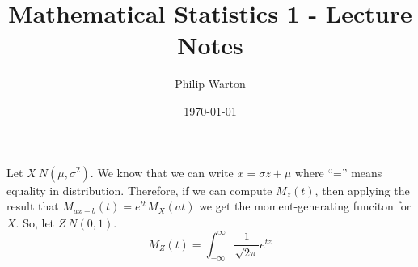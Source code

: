 \documentclass{article}
\begin{document}
\title{Mathematical Statistics 1 - Lecture Notes}
\author{Philip Warton}
\date{\today}
\maketitle
\section{}
Let $X ~ N(\mu, \sigma^2)$. We know that we can write $x = \sigma z + \mu$ where ``='' means equality in distribution.
Therefore, if we can compute $M_z(t)$, then applying the result that $M_{ax+b}(t) = e^{tb}M_X(at)$ we get the moment-generating funciton for $X$.
So, let $Z ~ N(0,1)$.
\[
    M_Z(t) = \int_{-\infty}^\infty \frac{1}{\sqrt{2 \pi}} e^{tz}
\]
\end{document}
